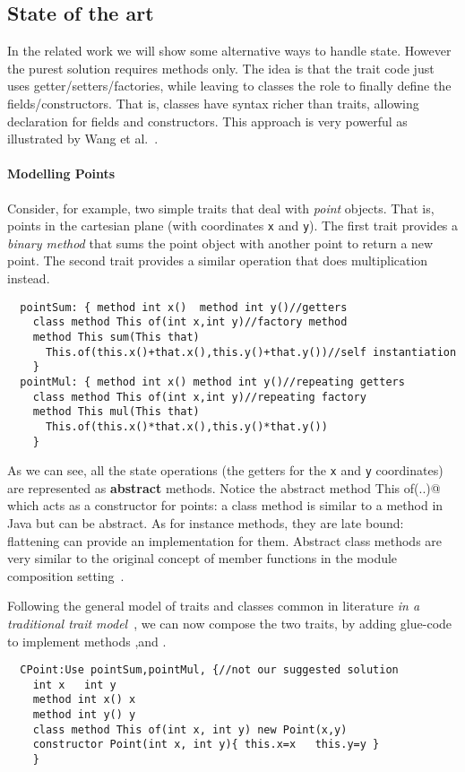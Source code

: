 \subsection{State of the art}
In the related work we will show some alternative ways to handle
state.  However the purest solution requires methods only. The idea is
that the trait code just uses getter/setters/factories, while leaving
to classes the role to finally define the fields/constructors. That
is, classes have syntax richer than traits, allowing
declaration for fields and constructors.  This approach is very
powerful as illustrated by Wang et al.~\cite{wang2016classless}.

\paragraph{Modelling Points} Consider, for example, two simple 
traits that deal with \emph{point} objects. That is, points
in the cartesian plane (with coordinates \lstinline{x} and
\lstinline{y}). The first trait provides a \emph{binary method} that 
sums the point object with another point to return a new point. 
The second trait provides a similar operation that does multiplication 
instead.
\saveSpace 
\begin{lstlisting}
  pointSum: { method int x()  method int y()//getters
    class method This of(int x,int y)//factory method
    method This sum(This that)
      This.of(this.x()+that.x(),this.y()+that.y())//self instantiation
    }
  pointMul: { method int x() method int y()//repeating getters
    class method This of(int x,int y)//repeating factory
    method This mul(This that)
      This.of(this.x()*that.x(),this.y()*that.y())
    }
\end{lstlisting}
\saveSpace
\noindent As we can see, all the state operations (the getters for the 
\lstinline{x} and \lstinline{y} coordinates) are represented as {\bf abstract} methods.
Notice the abstract \Q@class method This of(..)@ which acts as a constructor
for points:
a class method is similar to a \Q@static@ method in Java but can be abstract. 
As for instance methods, they are late bound:  flattening can provide an implementation for them.
Abstract class methods are very similar to the original concept of member functions in the module composition setting~\cite{ancona2002calculus}.

Following the general model of traits and classes common in literature \emph{in a traditional trait model}~\cite{Traits:ECOOP2003},
we can now compose the two traits, by adding glue-code
to implement methods \Q@x@,\Q@y@ and \Q@of@.
\begin{lstlisting}
  CPoint:Use pointSum,pointMul, {//not our suggested solution
    int x   int y
    method int x() x       
    method int y() y
    class method This of(int x, int y) new Point(x,y)
    constructor Point(int x, int y){ this.x=x   this.y=y }
    }
\end{lstlisting}

